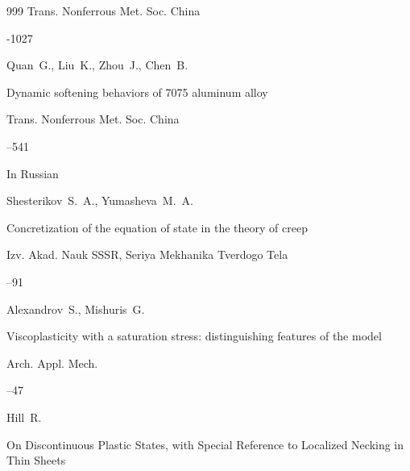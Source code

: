 \begin{thebibliography}{999}
\jour Trans. Nonferrous Met. Soc. China




-1027






\by Quan~G., Liu~K., Zhou~J., Chen~B.

\paper Dynamic softening behaviors of 7075 aluminum alloy

\jour Trans. Nonferrous Met. Soc. China



–541






\lang In Russian

\by Shesterikov~S.~A., Yumasheva~M.~A.

\paper Concretization of the equation of state in the theory of creep

\jour Izv. Akad. Nauk SSSR, Seriya Mekhanika Tverdogo Tela



--91




\by  Alexandrov~S., Mishuris~G.

\paper Viscoplasticity with a saturation stress: distinguishing features of the model

\jour Arch. Appl. Mech.




–47






\by  Hill~R. 

\paper On Discontinuous Plastic States, with Special Reference to Localized Necking in Thin Sheets


\end{thebibliography}
